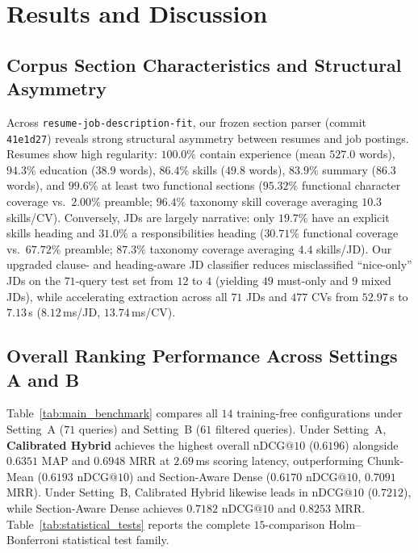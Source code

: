 \section{Results and Discussion}

\subsection{Corpus Section Characteristics and Structural Asymmetry}
Across \texttt{resume-job-\allowbreak description-fit}, our frozen section parser (commit \texttt{41e1d27}) reveals strong structural asymmetry between resumes and job postings. Resumes show high regularity: $100.0\%$ contain experience (mean $527.0$ words), $94.3\%$ education ($38.9$ words), $86.4\%$ skills ($49.8$ words), $83.9\%$ summary ($86.3$ words), and $99.6\%$ at least two functional sections ($95.32\%$ functional character coverage vs.\ $2.00\%$ preamble; $96.4\%$ taxonomy skill coverage averaging $10.3$ skills/CV). Conversely, JDs are largely narrative: only $19.7\%$ have an explicit skills heading and $31.0\%$ a responsibilities heading ($30.71\%$ functional coverage vs.\ $67.72\%$ preamble; $87.3\%$ taxonomy coverage averaging $4.4$ skills/JD). Our upgraded clause- and heading-aware JD classifier reduces misclassified ``nice-only'' JDs on the $71$-query test set from $12$ to $4$ (yielding $49$ must-only and $9$ mixed JDs), while accelerating extraction across all $71$ JDs and $477$ CVs from $52.97$\,s to $7.13$\,s ($8.12$\,ms/JD, $13.74$\,ms/CV).

\subsection{Overall Ranking Performance Across Settings A and B}
Table~\ref{tab:main_benchmark} compares all $14$ training-free configurations under Setting~A ($71$ queries) and Setting~B ($61$ filtered queries). Under Setting~A, \textbf{Calibrated Hybrid} achieves the highest overall $\text{nDCG}@10$ ($\mathbf{0.6196}$) alongside $0.6351$ $\text{MAP}$ and $0.6948$ $\text{MRR}$ at $2.69$\,ms scoring latency, outperforming Chunk-Mean ($0.6193$ $\text{nDCG}@10$) and Section-Aware Dense ($0.6170$ $\text{nDCG}@10$, $0.7091$ $\text{MRR}$). Under Setting~B, Calibrated Hybrid likewise leads in $\text{nDCG}@10$ ($\mathbf{0.7212}$), while Section-Aware Dense achieves $0.7182$ $\text{nDCG}@10$ and $0.8253$ $\text{MRR}$. Table~\ref{tab:statistical_tests} reports the complete $15$-comparison Holm--Bonferroni statistical test family.

